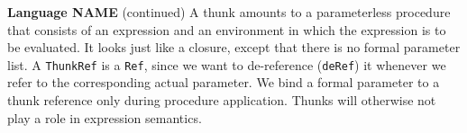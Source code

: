 \begin{minipage}[t]{\sw}
\slidenumber
\LARGE
{\bf Language NAME} (continued)\exx
A thunk amounts to a parameterless procedure
that consists of an expression and an environment
in which the expression is to be evaluated.
It looks just like a closure,
except that there is no formal parameter list.\exx
\emm\Large{}\exx
\LARGE
A \verb'ThunkRef' is a \verb'Ref', since we want
to de-reference (\verb'deRef') it
whenever we refer to the corresponding actual parameter.
We bind a formal parameter to a thunk reference
only during procedure application.
Thunks will otherwise not play a role in expression semantics.
\end{minipage}
\clearpage

